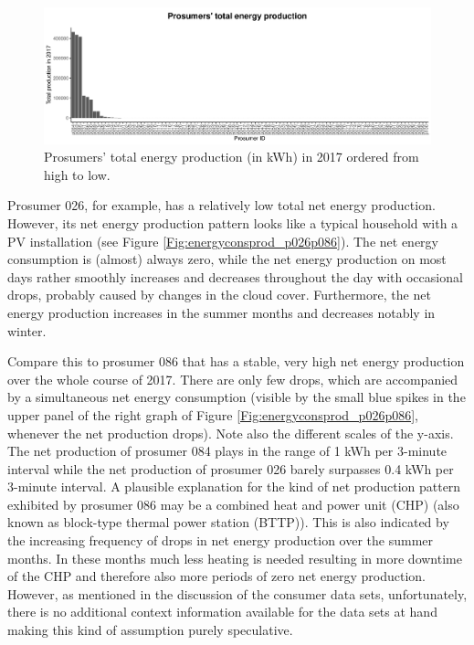 \begin{figure}[htbp]
 \centering
\includegraphics[width=\textwidth]{thesis/graphs/prosumer_totalproduction2.pdf}
\caption[Prosumers’ total energy production (in kWh) in 2017 ordered from high to low]{Prosumers’ total energy production (in kWh) in 2017 ordered from high to low. \quantnet}
\label{Fig:pros_total_production}
\end{figure}

Prosumer 026, for example, has a relatively low total net energy production. However, its net energy production pattern looks like a typical household with a PV installation (see Figure \ref{Fig:energyconsprod_p026p086}). The net energy consumption is (almost) always zero, while the net energy production on most days rather smoothly increases and decreases throughout the day with occasional drops, probably caused by changes in the cloud cover. Furthermore, the net energy production increases in the summer months and decreases notably in winter.

Compare this to prosumer 086 that has a stable, very high net energy production over the whole course of 2017. There are only few drops, which are accompanied by a simultaneous net energy consumption (visible by the small blue spikes in the upper panel of the right graph of Figure \ref{Fig:energyconsprod_p026p086}, whenever the net production drops). Note also the different scales of the y-axis. The net production of prosumer 084 plays in the range of 1 kWh per 3-minute interval while the net production of prosumer 026 barely surpasses 0.4 kWh per 3-minute interval. A plausible explanation for the kind of net production pattern exhibited by prosumer 086 may be a combined heat and power unit (CHP) (also known as block-type thermal power station (BTTP)). This is also indicated by the increasing frequency of drops in net energy production over the summer months. In these months much less heating is needed resulting in more downtime of the CHP and therefore also more periods of zero net energy production. However, as mentioned in the discussion of the consumer data sets, unfortunately, there is no additional context information available for the data sets at hand making this kind of assumption purely speculative.


